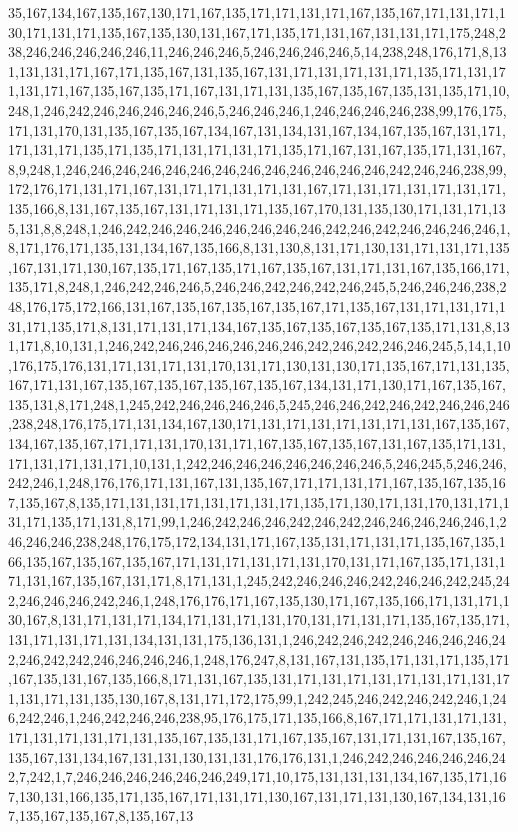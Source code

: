 35,167,134,167,135,167,130,171,167,135,171,171,131,171,167,135,167,171,131,171,130,171,131,171,135,167,135,130,131,167,171,135,171,131,167,131,131,171,175,248,238,246,246,246,246,246,11,246,246,246,5,246,246,246,246,5,14,238,248,176,171,8,131,131,131,171,167,171,135,167,131,135,167,131,171,131,171,131,171,135,171,131,171,131,171,167,135,167,135,171,167,131,171,131,135,167,135,167,135,131,135,171,10,248,1,246,242,246,246,246,246,246,5,246,246,246,1,246,246,246,246,238,99,176,175,171,131,170,131,135,167,135,167,134,167,131,134,131,167,134,167,135,167,131,171,171,131,171,135,171,135,171,131,171,131,171,135,171,167,131,167,135,171,131,167,8,9,248,1,246,246,246,246,246,246,246,246,246,246,246,246,246,242,246,246,238,99,172,176,171,131,171,167,131,171,171,131,171,131,167,171,131,171,131,171,131,171,135,166,8,131,167,135,167,131,171,131,171,135,167,170,131,135,130,171,131,171,135,131,8,8,248,1,246,242,246,246,246,246,246,246,246,242,246,242,246,246,246,246,1,8,171,176,171,135,131,134,167,135,166,8,131,130,8,131,171,130,131,171,131,171,135,167,131,171,130,167,135,171,167,135,171,167,135,167,131,171,131,167,135,166,171,135,171,8,248,1,246,242,246,246,5,246,246,242,246,242,246,245,5,246,246,246,238,248,176,175,172,166,131,167,135,167,135,167,135,167,171,135,167,131,171,131,171,131,171,135,171,8,131,171,131,171,134,167,135,167,135,167,135,167,135,171,131,8,131,171,8,10,131,1,246,242,246,246,246,246,246,246,242,246,242,246,246,245,5,14,1,10,176,175,176,131,171,131,171,131,170,131,171,130,131,130,171,135,167,171,131,135,167,171,131,167,135,167,135,167,135,167,135,167,134,131,171,130,171,167,135,167,135,131,8,171,248,1,245,242,246,246,246,246,5,245,246,246,242,246,242,246,246,246,238,248,176,175,171,131,134,167,130,171,131,171,131,171,131,171,131,167,135,167,134,167,135,167,171,171,131,170,131,171,167,135,167,135,167,131,167,135,171,131,171,131,171,131,171,10,131,1,242,246,246,246,246,246,246,246,5,246,245,5,246,246,242,246,1,248,176,176,171,131,167,131,135,167,171,171,131,171,167,135,167,135,167,135,167,8,135,171,131,131,171,131,171,131,171,135,171,130,171,131,170,131,171,131,171,135,171,131,8,171,99,1,246,242,246,246,242,246,242,246,246,246,246,246,1,246,246,246,238,248,176,175,172,134,131,171,167,135,131,171,131,171,135,167,135,166,135,167,135,167,135,167,171,131,171,131,171,131,170,131,171,167,135,171,131,171,131,167,135,167,131,171,8,171,131,1,245,242,246,246,246,242,246,246,242,245,242,246,246,246,242,246,1,248,176,176,171,167,135,130,171,167,135,166,171,131,171,130,167,8,131,171,131,171,134,171,131,171,131,170,131,171,131,171,135,167,135,171,131,171,131,171,131,134,131,131,175,136,131,1,246,242,246,242,246,246,246,246,242,246,242,242,246,246,246,246,1,248,176,247,8,131,167,131,135,171,131,171,135,171,167,135,131,167,135,166,8,171,131,167,135,131,171,131,171,131,171,131,171,131,171,131,171,131,135,130,167,8,131,171,172,175,99,1,242,245,246,242,246,242,246,1,246,242,246,1,246,242,246,246,238,95,176,175,171,135,166,8,167,171,171,131,171,131,171,131,171,131,171,131,135,167,135,131,171,167,135,167,131,171,131,167,135,167,135,167,131,134,167,131,131,130,131,131,176,176,131,1,246,242,246,246,246,246,242,7,242,1,7,246,246,246,246,246,246,249,171,10,175,131,131,131,134,167,135,171,167,130,131,166,135,171,135,167,171,131,171,130,167,131,171,131,130,167,134,131,167,135,167,135,167,8,135,167,13
